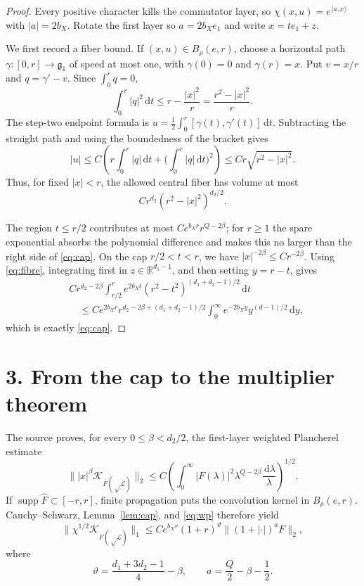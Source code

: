 \documentclass[10pt,a4paper]{article}
\newcommand{\R}{\mathbb R}
\newcommand{\cL}{\mathcal L}
\newcommand{\cK}{\mathcal K}
\newcommand{\dd}{\,\mathrm d}
\newcommand{\supp}{\operatorname{supp}}
\begin{document}
\begin{proof}
Every positive character kills the commutator layer, so
$\chi(x,u)=e^{\langle a,x\rangle}$ with $|a|=2b_X$.  Rotate the first layer so
$a=2b_Xe_1$ and write $x=te_1+z$.

We first record a fiber bound.  If $(x,u)\in B_\rho(e,r)$, choose a horizontal
path $\gamma:[0,r]\to\mathfrak g_1$ of speed at most one, with
$\gamma(0)=0$ and $\gamma(r)=x$.  Put $v=x/r$ and
$q=\gamma'-v$.  Since $\int_0^r q=0$,
\[
 \int_0^r|q|^2\dd t
 \le r-\frac{|x|^2}{r}=\frac{r^2-|x|^2}{r}.
\]
The step-two endpoint formula is
$u=\frac12\int_0^r[\gamma(t),\gamma'(t)]\dd t$.  Subtracting the straight
path and using the boundedness of the bracket gives
\[
 |u|\le C\left(r\int_0^r|q|\dd t+\Big(\int_0^r|q|\dd t\Big)^2\right)
 \le Cr\sqrt{r^2-|x|^2}.
\]
Thus, for fixed $|x|<r$, the allowed central fiber has volume at most
\begin{equation}\label{eq:fibre}
 C r^{d_2}(r^2-|x|^2)^{d_2/2}.
\end{equation}

The region $t\le r/2$ contributes at most
$Ce^{b_Xr}r^{Q-2\beta}$; for $r\ge1$ the spare exponential absorbs the
polynomial difference and makes this no larger than the right side of
\eqref{eq:cap}.  On the cap $r/2<t<r$, we have
$|x|^{-2\beta}\le Cr^{-2\beta}$.  Using \eqref{eq:fibre}, integrating first
in $z\in\R^{d_1-1}$, and then setting $y=r-t$, gives
\begin{align*}
 &Cr^{d_2-2\beta}\int_{r/2}^{r}e^{2b_Xt}
 (r^2-t^2)^{(d_1+d_2-1)/2}\dd t\\
 &\quad\le Ce^{2b_Xr}
 r^{d_2-2\beta+(d_1+d_2-1)/2}
 \int_0^\infty e^{-2b_Xy}y^{(d-1)/2}\dd y,
\end{align*}
which is exactly \eqref{eq:cap}.
\end{proof}

\section*{3. From the cap to the multiplier theorem}

The source proves, for every $0\le\beta<d_2/2$, the first-layer weighted
Plancherel estimate
\begin{equation}\label{eq:wp}
 \big\||x|^\beta\cK_{F(\sqrt\cL)}\big\|_2
 \le C\left(\int_0^\infty |F(\lambda)|^2
 \lambda^{Q-2\beta}\frac{\dd\lambda}{\lambda}\right)^{1/2}.
\end{equation}
If $\supp\widehat F\subset[-r,r]$, finite propagation puts the convolution
kernel in $B_\rho(e,r)$.  Cauchy--Schwarz, Lemma~\ref{lem:cap}, and
\eqref{eq:wp} therefore yield
\begin{equation}\label{eq:global}
 \|\chi^{1/2}\cK_{F(\sqrt\cL)}\|_1
 \le Ce^{b_Xr}(1+r)^\vartheta
 \|(1+|\cdot|)^aF\|_2,
\end{equation}
where
\begin{equation}\label{eq:parameters}
 \vartheta=\frac{d_1+3d_2-1}{4}-\beta,
 \qquad a=\frac Q2-\beta-\frac12.
\end{equation}
\end{document}
